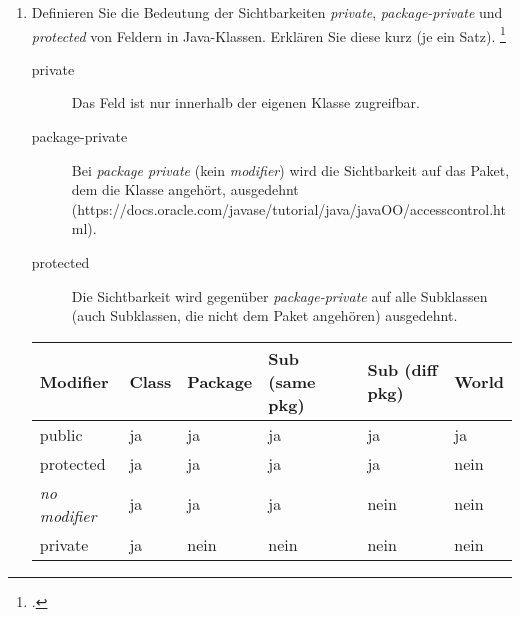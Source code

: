 \documentclass{bschlangaul-aufgabe}
\begin{document}



%

\begin{enumerate}


\item Definieren Sie die Bedeutung der Sichtbarkeiten \emph{private},
\emph{package-private} und \emph{protected} von Feldern in Java-Klassen.
Erklären Sie diese kurz (je ein Satz).
\footcite{examen:66116:2021:03}

\begin{bAntwort}
\begin{description}
\item[private]
Das Feld ist nur innerhalb der eigenen Klasse zugreifbar.

\item[package-private]
Bei \emph{package private} (kein \emph{modifier}) wird die Sichtbarkeit
auf das Paket, dem die Klasse angehört, ausgedehnt
(https://docs.oracle.com/javase/tutorial/java/javaOO/accesscontrol.html).

\item[protected]
Die Sichtbarkeit wird gegenüber \emph{package-private} auf alle
Subklassen
(auch Subklassen, die nicht dem Paket angehören) ausgedehnt.

\end{description}

\begin{tabular}{llllll}
Modifier & Class & Package & Sub (same pkg) & Sub (diff pkg) & World\\\hline
public & ja & ja & ja & ja & ja \\
protected & ja & ja & ja & ja & nein\\
\emph{no modifier} & ja & ja & ja & nein & nein\\
private & ja & nein & nein & nein & nein\\
\end{tabular}


\end{bAntwort}
\end{enumerate}
\end{document}
